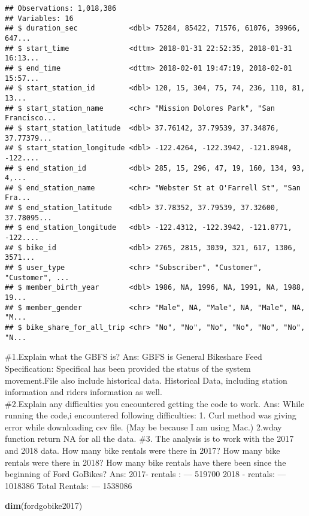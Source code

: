 \documentclass[]{article}
\newenvironment{Shaded}{\begin{snugshade}}{\end{snugshade}}
\newcommand{\KeywordTok}[1]{\textcolor[rgb]{0.13,0.29,0.53}{\textbf{#1}}}
\newcommand{\NormalTok}[1]{#1}
\begin{document}
\begin{verbatim}
## Observations: 1,018,386
## Variables: 16
## $ duration_sec            <dbl> 75284, 85422, 71576, 61076, 39966, 647...
## $ start_time              <dttm> 2018-01-31 22:52:35, 2018-01-31 16:13...
## $ end_time                <dttm> 2018-02-01 19:47:19, 2018-02-01 15:57...
## $ start_station_id        <dbl> 120, 15, 304, 75, 74, 236, 110, 81, 13...
## $ start_station_name      <chr> "Mission Dolores Park", "San Francisco...
## $ start_station_latitude  <dbl> 37.76142, 37.79539, 37.34876, 37.77379...
## $ start_station_longitude <dbl> -122.4264, -122.3942, -121.8948, -122....
## $ end_station_id          <dbl> 285, 15, 296, 47, 19, 160, 134, 93, 4,...
## $ end_station_name        <chr> "Webster St at O'Farrell St", "San Fra...
## $ end_station_latitude    <dbl> 37.78352, 37.79539, 37.32600, 37.78095...
## $ end_station_longitude   <dbl> -122.4312, -122.3942, -121.8771, -122....
## $ bike_id                 <dbl> 2765, 2815, 3039, 321, 617, 1306, 3571...
## $ user_type               <chr> "Subscriber", "Customer", "Customer", ...
## $ member_birth_year       <dbl> 1986, NA, 1996, NA, 1991, NA, 1988, 19...
## $ member_gender           <chr> "Male", NA, "Male", NA, "Male", NA, "M...
## $ bike_share_for_all_trip <chr> "No", "No", "No", "No", "No", "No", "N...
\end{verbatim}

\#1.Explain what the GBFS is? Ans: GBFS is General Bikeshare Feed
Specification: Specifical has been provided the status of the system
movement.File also include historical data. Historical Data, including
station information and riders information as well.\\
\newpage \#2.Explain any difficulties you encountered getting the code
to work. Ans: While running the code,i encountered following
difficulties: 1. Curl method was giving error while downloading csv
file. (May be because I am using Mac.) 2.wday function return NA for all
the data. \newpage \#3. The analysis is to work with the 2017 and 2018
data. How many bike rentals were there in 2017? How many bike rentals
were there in 2018? How many bike rentals have there been since the
beginning of Ford GoBikes? Ans: 2017- rentals : --- 519700 2018 -
rentals: --- 1018386 Total Rentals: --- 1538086

\begin{Shaded}
\begin{Highlighting}[]
\KeywordTok{dim}\NormalTok{(fordgobike2017)}
\end{Highlighting}
\end{Shaded}
\end{document}
